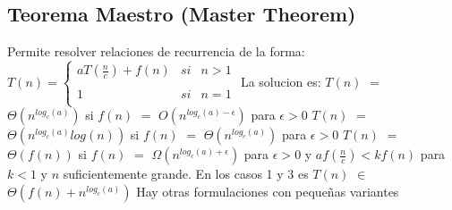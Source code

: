 \documentclass[10pt,a4paper]{article}
\begin{document}
\subsection{Teorema Maestro (Master Theorem)}

Permite resolver relaciones de recurrencia de la forma:
\newline
\newline
$T(n) = \left\{ \begin{array}{lcc}
	aT(\displaystyle \frac{n}{c}) + f(n) &   si  & n > 1 \\
	\\          1 &   si  & n = 1     \\
\end{array}
\right.$
\newline
\newline
\newline
La solucion es:
\newline
\newline
$T(n)$ $=$ $\Theta(n^{log_{c}(a)})$ si $f(n)$ $=$ $O(n^{log_{c}(a) - \epsilon})$ para $\epsilon > 0$
\newline
\newline
$T(n)$ $=$ $\Theta(n^{log_{c}(a)}log(n))$ si $f(n)$ $=$ $\Theta(n^{log_{c}(a)})$ para $\epsilon > 0$
\newline
\newline
$T(n)$ $=$ $\Theta(f(n))$ si $f(n)$ $=$ $\Omega(n^{log_{c}(a) + \epsilon})$ para $\epsilon > 0$ y $af(\displaystyle \frac{n}{c}) < kf(n)$ para $k < 1$ y $n$ suficientemente grande. 
\newline
\newline
En los casos 1 y 3 es $T(n)$ $\in$ $\Theta(f(n) + n^{log_{c}(a)})$
\newline
\newline
Hay otras formulaciones con pequeñas variantes

\newpage
\end{document}
